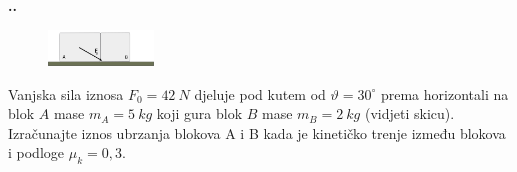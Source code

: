 

\noindent 
\textbf{
\thecjelina.\thezadatak.}
\begin{figure} %
    \centering
    \includegraphics[width=0.25\textwidth]{03_Dinamika_materijalne_tocke/blok_Zadatak_4_3.png}
\end{figure}
Vanjska sila iznosa $F_0=42\ N$ djeluje pod kutem od $\vartheta = 30^\circ$ prema horizontali na blok $A$ mase $m_A=5 \ kg$ koji gura blok 
$B$ mase $m_B=2\ kg$ (vidjeti skicu). Izračunajte iznos ubrzanja blokova A i B kada je kinetičko trenje između blokova i podloge $\mu _k=0,3$.


